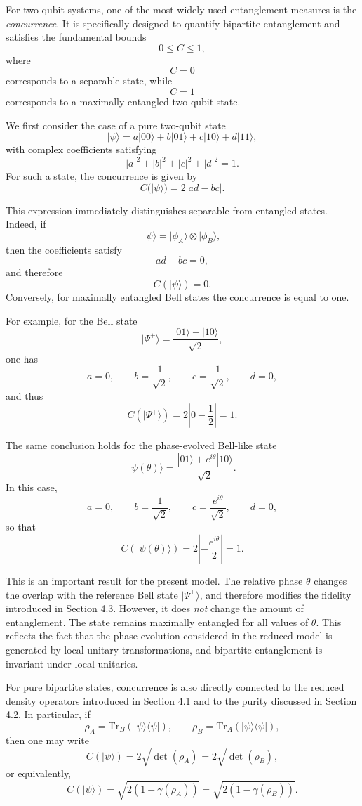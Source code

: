 \documentclass[a4paper]{article}
\begin{document}
For two-qubit systems, one of the most widely used entanglement measures is the \emph{concurrence}. It is specifically designed to quantify bipartite entanglement and satisfies the fundamental bounds
\[
0 \le C \le 1,
\]
where
\[
C = 0
\]
corresponds to a separable state, while
\[
C = 1
\]
corresponds to a maximally entangled two-qubit state.

\medskip

We first consider the case of a pure two-qubit state
\[
|\psi\rangle
=
a|00\rangle + b|01\rangle + c|10\rangle + d|11\rangle,
\]
with complex coefficients satisfying
\[
|a|^2 + |b|^2 + |c|^2 + |d|^2 = 1.
\]
For such a state, the concurrence is given by
\[
C(|\psi\rangle) = 2|ad - bc|.
\]

This expression immediately distinguishes separable from entangled states. Indeed, if
\[
|\psi\rangle = |\phi_A\rangle \otimes |\phi_B\rangle,
\]
then the coefficients satisfy
\[
ad - bc = 0,
\]
and therefore
\[
C(|\psi\rangle)=0.
\]
Conversely, for maximally entangled Bell states the concurrence is equal to one.

\medskip

For example, for the Bell state
\[
|\Psi^+\rangle = \frac{|01\rangle + |10\rangle}{\sqrt{2}},
\]
one has
\[
a=0,\qquad b=\frac{1}{\sqrt{2}},\qquad c=\frac{1}{\sqrt{2}},\qquad d=0,
\]
and thus
\[
C(|\Psi^+\rangle)
=
2\left|0 - \frac{1}{2}\right|
=
1.
\]

The same conclusion holds for the phase-evolved Bell-like state
\[
|\psi(\theta)\rangle
=
\frac{|01\rangle + e^{i\theta}|10\rangle}{\sqrt{2}}.
\]
In this case,
\[
a=0,\qquad b=\frac{1}{\sqrt{2}},\qquad c=\frac{e^{i\theta}}{\sqrt{2}},\qquad d=0,
\]
so that
\[
C(|\psi(\theta)\rangle)
=
2\left|-\frac{e^{i\theta}}{2}\right|
=
1.
\]

This is an important result for the present model. The relative phase \(\theta\) changes the overlap with the reference Bell state \( |\Psi^+\rangle \), and therefore modifies the fidelity introduced in Section 4.3. However, it does \emph{not} change the amount of entanglement. The state remains maximally entangled for all values of \(\theta\). This reflects the fact that the phase evolution considered in the reduced model is generated by local unitary transformations, and bipartite entanglement is invariant under local unitaries.

\medskip

For pure bipartite states, concurrence is also directly connected to the reduced density operators introduced in Section 4.1 and to the purity discussed in Section 4.2. In particular, if
\[
\rho_A = \mathrm{Tr}_B(|\psi\rangle\langle\psi|),
\qquad
\rho_B = \mathrm{Tr}_A(|\psi\rangle\langle\psi|),
\]
then one may write
\[
C(|\psi\rangle)
=
2\sqrt{\det(\rho_A)}
=
2\sqrt{\det(\rho_B)},
\]
or equivalently,
\[
C(|\psi\rangle)
=
\sqrt{2\left(1-\gamma(\rho_A)\right)}
=
\sqrt{2\left(1-\gamma(\rho_B)\right)}.
\]
\end{document}
